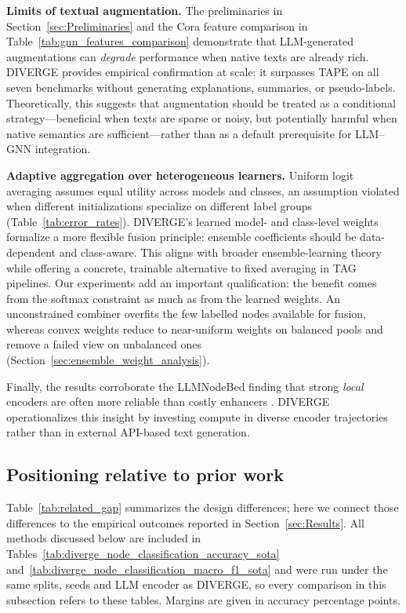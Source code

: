 \documentclass[a4paper,fleqn]{cas-sc}
\newcommand{\revthree}[1]{\textcolor{revgreen}{#1}} %
\DeclareRobustCommand{\revcommon}[2][]{\textcolor{revshared}{#2}} %
\begin{document}
\textbf{Limits of textual augmentation.} The preliminaries in Section~\ref{sec:Preliminaries} and the Cora feature comparison in Table~\ref{tab:gnn_features_comparison} demonstrate that LLM-generated augmentations can \emph{degrade} performance when native texts are already rich. DIVERGE provides empirical confirmation at scale: it surpasses TAPE on all \revthree{seven} benchmarks without generating explanations, summaries, or pseudo-labels. Theoretically, this suggests that augmentation should be treated as a conditional strategy---beneficial when texts are sparse or noisy, but potentially harmful when native semantics are sufficient---rather than as a default prerequisite for LLM--GNN integration.

\textbf{Adaptive aggregation over heterogeneous learners.} Uniform logit averaging assumes equal utility across models and classes, an assumption violated when different initializations specialize on different label groups (Table~\ref{tab:error_rates}). DIVERGE's learned model- and class-level weights formalize a more flexible fusion principle: ensemble coefficients should be data-dependent and class-aware. This aligns with broader ensemble-learning theory while offering a concrete, trainable alternative to fixed averaging in TAG pipelines. \revcommon[R1,R2,R4]{Our experiments add an important qualification: the benefit comes from the softmax constraint as much as from the learned weights. An unconstrained combiner overfits the few labelled nodes available for fusion, whereas convex weights reduce to near-uniform weights on balanced pools and remove a failed view on unbalanced ones (Section~\ref{sec:ensemble_weight_analysis}).}

Finally, the results corroborate the LLMNodeBed finding that strong \emph{local} encoders are often more reliable than costly enhancers \citep{Wu2025LLMNode}. DIVERGE operationalizes this insight by investing compute in diverse encoder trajectories rather than in external API-based text generation.

\subsection{Positioning relative to prior work}

Table~\ref{tab:related_gap} summarizes the design differences; here we connect those differences to the empirical outcomes reported in Section~\ref{sec:Results}. \revcommon[R2,R4]{All methods discussed below are included in Tables~\ref{tab:diverge_node_classification_accuracy_sota} and~\ref{tab:diverge_node_classification_macro_f1_sota} and were run under the same splits, seeds and LLM encoder as DIVERGE, so every comparison in this subsection refers to these tables. Margins are given in accuracy percentage points.}
\end{document}
